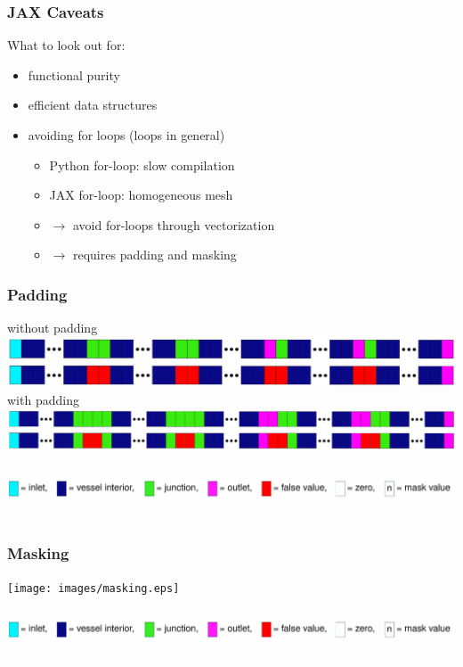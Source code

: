 \documentclass[compress]{beamer}
\begin{document}
\begin{frame}
	\frametitle{JAX Caveats}
	\begin{block}{What to look out for:}
		\begin{itemize}
			\item<2-> functional purity
			\item<3-> efficient data structures
			\item<4-> avoiding for loops (loops in general)
				\begin{itemize}
					\item<5-> Python for-loop: slow compilation
					\item<6-> JAX for-loop: homogeneous mesh 
					\item<7-> $\rightarrow$ avoid for-loops through vectorization
					\item<8-> $\rightarrow$ requires padding and masking
				\end{itemize}
		\end{itemize}
	\end{block}
\end{frame}

\begin{frame}
	\frametitle{Padding}
	without padding
	\includegraphics[width=\textwidth]{images/padding1.eps}
	with padding
	\includegraphics[width=\textwidth]{images/padding2.eps}
	\includegraphics[width=\textwidth]{images/legend.eps}
\end{frame}
\begin{frame}
	\frametitle{Masking}
	\texttt{[image: images/masking.eps]}
	\includegraphics[width=\textwidth]{images/legend.eps}
\end{frame}
\end{document}
